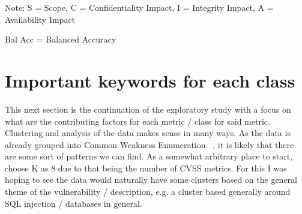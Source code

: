 \documentclass[12pt]{article}
\begin{document}
\begin{table}[H]
	\centering
	\caption{Comparison of the effects of the pre-trained models on the CVSS v3.1 dataset (Part 2).}
	\label{tab:distil_part2}
	\begin{tablenotes}
		\small
		\item Note: S = Scope, C = Confidentiality Impact, I = Integrity Impact, A = Availability
		Impact
		\item Bal Acc = Balanced Accuracy
	\end{tablenotes}
\end{table}

\section{Important keywords for each class}

This next section is the continuation of the exploratory study with a focus on what are the
contributing factors for each metric / class for said metric. Clustering and analysis of the data
makes sense in many ways. As the data is already grouped into Common Weakness Enumeration~\cite{CWE}
, it is likely that there are some sort of patterns we can find. As a somewhat arbitrary place to
start, choose K as 8 due to that being the number of CVSS metrics. For this I was hoping to see the
data would naturally have some clusters based on the general theme of the vulnerability /
description, e.g. a cluster based generally around SQL injection / databases in general.
\end{document}
